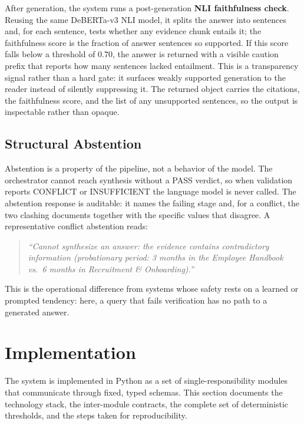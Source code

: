 \documentclass[conference]{IEEEtran}
\begin{document}
After generation, the system runs a post-generation \textbf{NLI
faithfulness check}. Reusing the same DeBERTa-v3 NLI model, it splits the
answer into sentences and, for each sentence, tests whether any evidence
chunk entails it; the faithfulness score is the fraction of answer
sentences so supported. If this score falls below a threshold of $0.70$,
the answer is returned with a visible caution prefix that reports how many
sentences lacked entailment. This is a transparency signal rather than a
hard gate: it surfaces weakly supported generation to the reader instead of
silently suppressing it. The returned object carries the citations, the
faithfulness score, and the list of any unsupported sentences, so the
output is inspectable rather than opaque.

\subsection{Structural Abstention}
\label{sec:abstention}
Abstention is a property of the pipeline, not a behavior of the model. The
orchestrator cannot reach synthesis without a PASS verdict, so when
validation reports CONFLICT or INSUFFICIENT the language model is never
called. The abstention response is auditable: it names the failing stage
and, for a conflict, the two clashing documents together with the specific
values that disagree. A representative conflict abstention reads:
\begin{quote}\small\itshape
``Cannot synthesize an answer: the evidence contains contradictory
information (probationary period: 3 months in the Employee Handbook vs.\
6 months in Recruitment \& Onboarding).''
\end{quote}
This is the operational difference from systems whose safety rests on a
learned or prompted tendency: here, a query that fails verification has no
path to a generated answer.

\section{Implementation}
\label{sec:impl}

The system is implemented in Python as a set of single-responsibility
modules that communicate through fixed, typed schemas. This section
documents the technology stack, the inter-module contracts, the complete
set of deterministic thresholds, and the steps taken for reproducibility.
\end{document}
